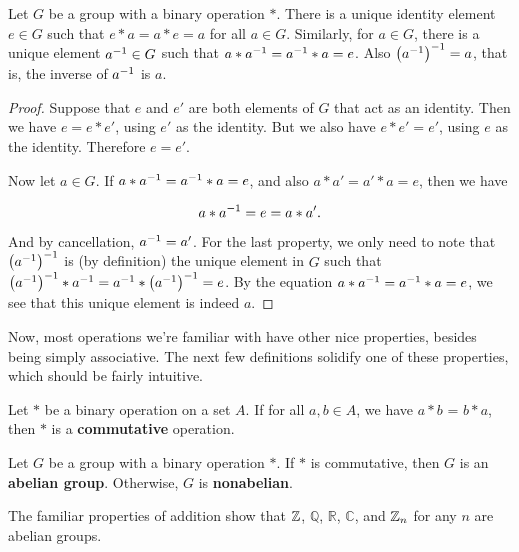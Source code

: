 \begin{theorem}
Let $G$ be a group with a binary operation $*$. There is a unique identity element $e \in G$ such that $e*a = a*e = a$ for all $a \in G$. Similarly, for $a \in G$, there is a unique element $\inv{a} \in G$ such that $a*\inv{a} = \inv{a}*a = e$. Also $\left(\inv{a}\right)^{-1} = a$, that is, the inverse of $\inv a$ is $a$.
\end{theorem}

\begin{proof}
Suppose that $e$ and $e'$ are both elements of $G$ that act as an identity. Then we have $e = e*e'$, using $e'$ as the identity. But we also have $e*e' = e'$, using $e$ as the identity. Therefore $e = e'$.

Now let $a \in G$. If $a*\inv{a} = \inv{a}*a = e$, and also $a*a' = a'*a = e$, then we have

\begin{equation*}
    a*\inv{a} = e = a*a'.
\end{equation*}

And by cancellation, $\inv{a} = a'$. For the last property, we only need to note that $\left(\inv{a}\right)^{-1}$ is (by definition) the unique element in $G$ such that $\left(\inv{a}\right)^{-1} * \inv{a} = \inv{a} * \left(\inv{a}\right)^{-1} = e$. By the equation $a * \inv{a} = \inv{a} * a = e$, we see that this unique element is indeed $a$.

\end{proof}

Now, most operations we're familiar with have other nice properties, besides being simply associative. The next few definitions solidify one of these properties, which should be fairly intuitive.

\begin{definition}
Let $*$ be a binary operation on a set $A$. \extra If for all $a, b \in A$, we have $a * b$ = $b * a$, then $*$ is a \textbf{commutative} operation.
\end{definition}

\begin{definition}
Let $G$ be a group with a binary operation $*$. \extra If $*$ is commutative, then $G$ is an \textbf{abelian group}. Otherwise, $G$ is \textbf{nonabelian}.
\end{definition}

\begin{example}
The familiar properties of addition show that $\z$, $\mathbb{Q}$, $\mathbb{R}$, $\mathbb{C}$, and $\zn[n]$ for any $n$ are abelian groups.
\end{example}

